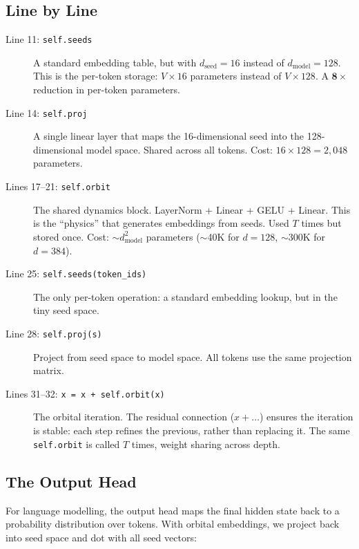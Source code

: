 \documentclass[11pt, a4paper]{article}
\theoremstyle{remark}
\begin{document}
\subsection{Line by Line}

\begin{description}
    \item[Line 11: \texttt{self.seeds}] A standard embedding table, but with $d_{\text{seed}} = 16$ instead of $d_{\text{model}} = 128$.
    This is the per-token storage: $V \times 16$ parameters instead of $V \times 128$.
    A $\mathbf{8\times}$ reduction in per-token parameters.

    \item[Line 14: \texttt{self.proj}] A single linear layer that maps the 16-dimensional seed into the 128-dimensional model space.
    Shared across all tokens.
    Cost: $16 \times 128 = 2{,}048$ parameters.

    \item[Lines 17--21: \texttt{self.orbit}] The shared dynamics block.
    LayerNorm + Linear + GELU + Linear.
    This is the ``physics'' that generates embeddings from seeds.
    Used $T$ times but stored once.
    Cost: $\sim d_{\text{model}}^2$ parameters ($\sim$40K for $d = 128$, $\sim$300K for $d = 384$).

    \item[Line 25: \texttt{self.seeds(token\_ids)}] The only per-token operation: a standard embedding lookup, but in the tiny seed space.

    \item[Line 28: \texttt{self.proj(s)}] Project from seed space to model space.
    All tokens use the same projection matrix.

    \item[Lines 31--32: \texttt{x = x + self.orbit(x)}] The orbital iteration.
    The residual connection ($x + \ldots$) ensures the iteration is stable: each step refines the previous, rather than replacing it.
    The same \texttt{self.orbit} is called $T$ times, weight sharing across depth.
\end{description}

\subsection{The Output Head}

For language modelling, the output head maps the final hidden state back to a probability distribution over tokens.
With orbital embeddings, we project back into seed space and dot with all seed vectors:
\end{document}
